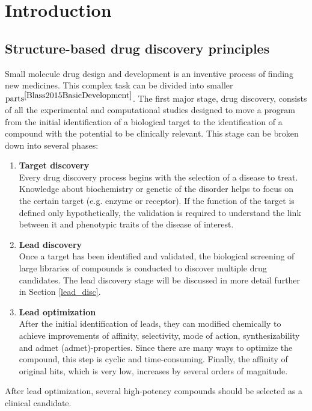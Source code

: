 \chapter{Introduction}
\section{Structure-based drug discovery principles}
Small molecule drug design and development is an inventive process of finding new medicines.
This complex task can be divided into smaller $\text{parts}^{\cite{Blass2015BasicDevelopment}}$. 
The first major stage, drug discovery, consists of all the experimental and computational studies designed to move a program from the initial identification of a biological target to the identification of a compound with the potential to be clinically relevant.
This stage can be broken down into several phases:
\begin{enumerate}
    \item \textbf{Target discovery}\\
    Every drug discovery process begins with the selection of a disease to treat.
    Knowledge about biochemistry or genetic of the disorder helps to focus on the certain target (e.g. enzyme or receptor).
    If the function of the target is defined only hypothetically, the validation is required to understand the link between it and phenotypic traits of the disease of interest.
    \item \textbf{Lead discovery}\\
    Once a target has been identified and validated, the biological screening of large libraries of compounds is conducted to discover multiple drug candidates.
    The lead discovery stage will be discussed in more detail further in Section \ref{lead_disc}.
    \item \textbf{Lead optimization}\\
    After the initial identification of leads, they can modified chemically to achieve improvements of  affinity, selectivity, mode of action, synthesizability and \acrshort{admet} (\acrlong{admet})-properties.  
    Since there are many ways to optimize the compound, this step is cyclic and time-consuming. Finally, the affinity of \glqq original hits\grqq, which is very low, increases by several orders of magnitude.
\end{enumerate}

After lead optimization, several high-potency compounds should be selected as a clinical candidate.

